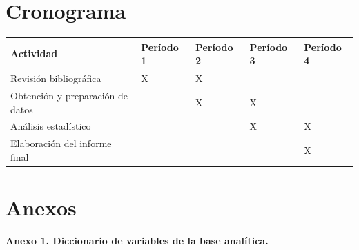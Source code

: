 \documentclass[
  spanish,
  12pt,
]{article}
\newcounter{none} %
\begin{document}
\section{Cronograma}\label{cronograma}

{\def\LTcaptype{none} %
\begin{longtable}[]{@{}
  >{\raggedright\arraybackslash}p{}
  >{\centering\arraybackslash}p{}
  >{\centering\arraybackslash}p{}
  >{\centering\arraybackslash}p{}
  >{\centering\arraybackslash}p{}@{}}
\toprule\noalign{}
\begin{minipage}[b]{\linewidth}\raggedright
Actividad
\end{minipage} & \begin{minipage}[b]{\linewidth}\centering
Período 1
\end{minipage} & \begin{minipage}[b]{\linewidth}\centering
Período 2
\end{minipage} & \begin{minipage}[b]{\linewidth}\centering
Período 3
\end{minipage} & \begin{minipage}[b]{\linewidth}\centering
Período 4
\end{minipage} \\
\midrule\noalign{}
\endhead
\bottomrule\noalign{}
\endlastfoot
Revisión bibliográfica & X & X & & \\
Obtención y preparación de datos & & X & X & \\
Análisis estadístico & & & X & X \\
Elaboración del informe final & & & & X \\
\end{longtable}
}

\section{Anexos}\label{anexos}

\textbf{Anexo 1. Diccionario de variables de la base analítica.}
\end{document}

